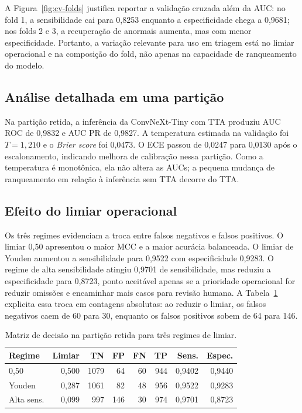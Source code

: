 A Figura~\ref{fig:cv-folds} justifica reportar a validação cruzada além da AUC:
no fold 1, a sensibilidade cai para 0,8253 enquanto a especificidade chega a
0,9681; nos folds 2 e 3, a recuperação de anormais aumenta, mas com menor
especificidade. Portanto, a variação relevante para uso em triagem está no
limiar operacional e na composição do fold, não apenas na capacidade de
ranqueamento do modelo.

\subsection{Análise detalhada em uma partição}

Na partição retida, a inferência da ConvNeXt-Tiny com TTA produziu AUC ROC de
0,9832 e AUC PR de 0,9827. A temperatura estimada na validação foi
$T=1{,}210$ e o \emph{Brier score} foi 0,0473. O ECE passou de 0,0247 para
0,0130 após o escalonamento, indicando melhora de calibração nessa partição.
Como a temperatura é monotônica, ela não altera as AUCs; a pequena mudança de
ranqueamento em relação à inferência sem TTA decorre do TTA.

\subsection{Efeito do limiar operacional}

Os três regimes evidenciam a troca entre falsos negativos e falsos positivos.
O limiar 0,50 apresentou o maior MCC e a maior acurácia balanceada. O limiar de
Youden aumentou a sensibilidade para 0,9522 com especificidade 0,9283. O regime
de alta sensibilidade atingiu 0,9701 de sensibilidade, mas reduziu a
especificidade para 0,8723, ponto aceitável apenas se a prioridade operacional
for reduzir omissões e encaminhar mais casos para revisão humana. A
Tabela~\ref{tab:confusao-limiares} explicita essa troca em contagens absolutas:
ao reduzir o limiar, os falsos negativos caem de 60 para 30, enquanto os falsos
positivos sobem de 64 para 146.

\begin{table}[ht]
\centering
\caption{Matriz de decisão na partição retida para três regimes de limiar.}
\label{tab:confusao-limiares}
\scriptsize
\setlength{\tabcolsep}{3.5pt}
\begin{tabular}{lrrrrrrr}
\toprule
Regime & Limiar & TN & FP & FN & TP & Sens. & Espec. \\
\midrule
0,50 & 0,500 & 1079 & 64 & 60 & 944 & 0,9402 & 0,9440 \\
Youden & 0,287 & 1061 & 82 & 48 & 956 & 0,9522 & 0,9283 \\
Alta sens. & 0,099 & 997 & 146 & 30 & 974 & 0,9701 & 0,8723 \\
\bottomrule
\end{tabular}
\end{table}

